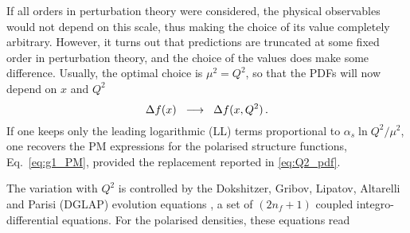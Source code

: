 If all orders in perturbation theory were considered, the physical observables would not depend on this scale, thus making the choice of its value completely arbitrary. However, it turns out that predictions are truncated at some fixed order in perturbation theory, and the choice of the values does make some difference. Usually, the optimal choice is $\mu^2 = Q^2$, so that the PDFs will now depend on $x$ and $Q^2$
\begin{equation}
  \Delta f(x)  \hspace{2mm} \longrightarrow \hspace{2mm} \Delta f(x,Q^2) \,.
  \label{eq:Q2_pdf}
\end{equation}
If one keeps only the leading logarithmic (LL) terms proportional to $\alpha_{s} \ln Q^2/\mu^2$, one recovers the PM expressions for the polarised structure functions, Eq.~\eqref{eq:g1_PM}, provided the replacement reported in \eqref{eq:Q2_pdf}.\par
The variation with $Q^2$ is controlled by the Dokshitzer, Gribov, Lipatov, Altarelli and Parisi (DGLAP) evolution equations \cite{Altarelli:1977zs, Dokshitzer:1977sg, Gribov:1972ri}, a set of $(2 n_f + 1)$ coupled integro-differential equations. For the polarised densities, these equations read
